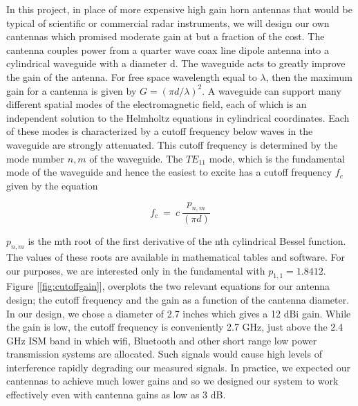\documentclass[reprint, aps, prl]{revtex4-1}
\begin{document}
In this project, in place of more expensive high gain horn antennas that would be typical of scientific or commercial radar instruments, we will design our own cantennas which promised moderate gain at but a fraction of the cost. The cantenna couples power from a quarter wave coax line dipole antenna into a cylindrical waveguide with a diameter d. The waveguide acts to greatly improve the gain of the antenna. For free space wavelength equal to $\lambda$, then the maximum gain for a cantenna is given by $G = \left(\pi d/ \lambda\right)^2$. A waveguide can support many different spatial modes of the electromagnetic field, each of which is an independent solution to the Helmholtz equations in cylindrical coordinates. Each of these modes is characterized by a cutoff frequency below waves in the waveguide are strongly attenuated. This cutoff frequency is determined by the mode number $n, m$ of the waveguide. The $TE_{11}$ mode, which is the fundamental mode of the waveguide and hence the easiest to excite has a cutoff frequency $f_c$ given by the equation

\begin{equation}
    f_c\ =\ c\ \frac{p_{n,m}}{(\pi d)}
\end{equation}

$p_{n,m }$ is the mth root of the first derivative of the nth cylindrical Bessel function. The values of these roots are available in mathematical tables and software. For our purposes, we are interested only in the fundamental with $p_{1,1} = 1.8412$. Figure [\ref{fig:cutoffgain}], overplots the two relevant equations for our antenna design; the cutoff frequency and the gain as a function of the cantenna diameter. In our design, we chose a diameter of 2.7 inches which gives a 12 dBi gain. While the gain is low, the cutoff frequency is conveniently 2.7 GHz, just above the 2.4 GHz ISM band in which wifi, Bluetooth and other short range low power transmission systems are allocated. Such signals would cause high levels of interference rapidly degrading our measured signals. In practice, we expected our cantennas to achieve much lower gains and so we designed our system to work effectively even with cantenna gains as low as 3 dB.
\end{document}
